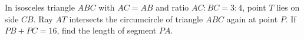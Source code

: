 In isosceles triangle $ABC$ with $AC=AB$ and ratio $AC:BC=3:4$, point $T$ lies on side $CB$. Ray $AT$ intersects the circumcircle of triangle $ABC$ again at point $P$. If $PB+PC = 16$, find the length of segment $PA$.
